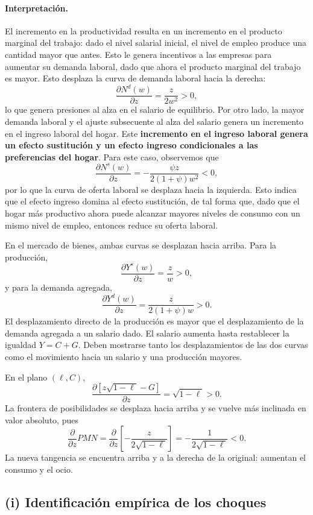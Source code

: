 \documentclass[11pt]{article}
\begin{document}
\paragraph{Interpretación.} El incremento en la productividad resulta en un incremento en el producto marginal del trabajo: dado el nivel salarial inicial, el nivel de empleo produce una cantidad mayor que antes. Esto le genera incentivos a las empresas para aumentar su demanda laboral, dado que ahora el producto marginal del trabajo es mayor. Esto desplaza la curva de demanda laboral hacia la derecha:
\[
  \frac{\partial N^d(w)}{\partial z}
  =\frac{z}{2w^2}>0,
\]
lo que genera presiones al alza en el salario de equilibrio. Por otro lado, la mayor demanda laboral y el ajuste subsecuente al alza del salario genera un incremento en el ingreso laboral del hogar. Este \textbf{incremento en el ingreso laboral genera un efecto sustitución y un efecto ingreso condicionales a las preferencias del hogar}.
Para este caso, observemos que
\[
  \frac{\partial N^s(w)}{\partial z}
  =-\frac{\psi z}{2(1+\psi)w^2}<0,
\]
por lo que la curva de oferta laboral se desplaza hacia la izquierda. Esto indica que el efecto ingreso domina al efecto sustitución, de tal forma que, dado que el hogar más productivo ahora puede alcanzar mayores niveles de consumo con un mismo nivel de empleo, entonces reduce su oferta laboral.

En el mercado de bienes, ambas curvas se desplazan hacia arriba. Para la producción,
\[
  \frac{\partial Y^s(w)}{\partial z}=\frac{z}{w}>0,
\]
y para la demanda agregada,
\[
  \frac{\partial Y^d(w)}{\partial z}
  =\frac{z}{2(1+\psi)w}>0.
\]
El desplazamiento directo de la producción es mayor que el desplazamiento de la demanda agregada a un salario dado. El salario aumenta hasta restablecer la igualdad $Y=C+G$. Deben mostrarse tanto los desplazamientos de las dos curvas como el movimiento hacia un salario y una producción mayores.

En el plano $(\ell,C)$,
\[
  \frac{\partial[z\sqrt{1-\ell}-G]}{\partial z}
  =\sqrt{1-\ell}>0.
\]
La frontera de posibilidades se desplaza hacia arriba y se vuelve más inclinada en valor absoluto, pues
\[\frac{\partial}{\partial z}
  PMN 
  =
  \frac{\partial}{\partial z}
  \left[-\frac{z}{2\sqrt{1-\ell}}\right]
  =-\frac{1}{2\sqrt{1-\ell}}<0.
\]
La nueva tangencia se encuentra arriba y a la derecha de la original: aumentan el consumo y el ocio.

\subsection*{(i) Identificación empírica de los choques}
\end{document}
